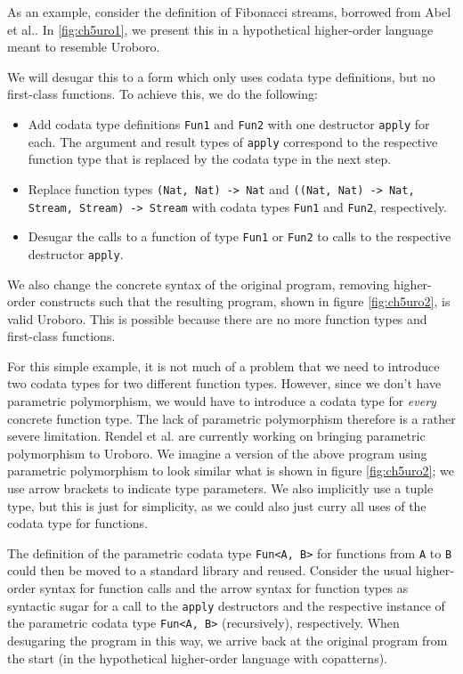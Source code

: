 As an example, consider the definition of Fibonacci streams, borrowed from Abel et al.\cite{abel13copatterns}. In \autoref{fig:ch5uro1}, we present this in a hypothetical higher-order language meant to resemble Uroboro.

We will desugar this to a form which only uses codata type definitions, but no first-class functions. To achieve this, we do the following:
\begin{itemize}
\item Add codata type definitions \texttt{Fun1} and \texttt{Fun2} with one destructor \texttt{apply} for each. The argument and result types of \texttt{apply} correspond to the respective function type that is replaced by the codata type in the next step.

\item Replace function types \texttt{(Nat, Nat) -> Nat} and \texttt{((Nat, Nat) -> Nat, Stream, Stream) -> Stream} with codata types \texttt{Fun1} and \texttt{Fun2}, respectively.

\item Desugar the calls to a function of type \texttt{Fun1} or \texttt{Fun2} to calls to the respective destructor \texttt{apply}.
\end{itemize}
We also change the concrete syntax of the original program, removing higher-order constructs such that the resulting program, shown in figure \autoref{fig:ch5uro2}, is valid Uroboro. This is possible because there are no more function types and first-class functions.

For this simple example, it is not much of a problem that we need to introduce two codata types for two different function types. However, since we don't have parametric polymorphism, we would have to introduce a codata type for \textit{every} concrete function type. The lack of parametric polymorphism therefore is a rather severe limitation. Rendel et al. are currently working on bringing parametric polymorphism to Uroboro. We imagine a version of the above program using parametric polymorphism to look similar what is shown in figure \autoref{fig:ch5uro2}; we use arrow brackets to indicate type parameters. We also implicitly use a tuple type, but this is just for simplicity, as we could also just curry all uses of the codata type for functions.

The definition of the parametric codata type \texttt{Fun<A, B>} for functions from \texttt{A} to \texttt{B} could then be moved to a standard library and reused. Consider the usual higher-order syntax for function calls and the arrow syntax for function types as syntactic sugar for a call to the \texttt{apply} destructors and the respective instance of the parametric codata type \texttt{Fun<A, B>} (recursively), respectively. When desugaring the program in this way, we arrive back at the original program from the start (in the hypothetical higher-order language with copatterns).

